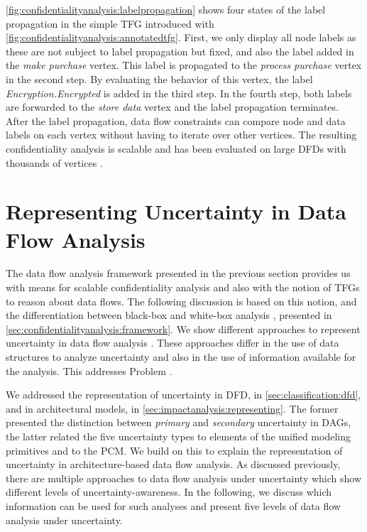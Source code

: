 \autoref{fig:confidentialityanalysis:labelpropagation} shows four states of the label propagation in the simple \ac{TFG} introduced with \autoref{fig:confidentialityanalysis:annotatedtfg}.
First, we only display all node labels as these are not subject to label propagation but fixed, and also the label added in the \emph{make purchase} vertex.
This label is propagated to the \emph{process purchase} vertex in the second step.
By evaluating the behavior of this vertex, the label \emph{Encryption.Encrypted} is added in the third step.
In the fourth step, both labels are forwarded to the \emph{store data} vertex and the label propagation terminates.
After the label propagation, data flow constraints can compare node and data labels on each vertex without having to iterate over other vertices.
The resulting confidentiality analysis is scalable and has been evaluated on large \acp{DFD} with thousands of vertices \cite{schwickerath_tool-supported_2023}. 






\section{Representing Uncertainty in Data Flow Analysis}%
\label{sec:confidentialityanalysis:representing}

The data flow analysis framework \cite{boltz_extensible_2024} presented in the previous section provides us with means for scalable confidentiality analysis and also with the notion of \acp{TFG} to reason about data flows.
The following discussion is based on this notion, and the differentiation between black-box and white-box analysis \cite{taghavi_survey_2023,heinrich_composing_2021}, presented in \autoref{sec:confidentialityanalysis:framework}.
We show different approaches to represent uncertainty in data flow analysis \cite{hahner_model-based_2023}.
These approaches differ in the use of data structures to analyze uncertainty and also in the use of information available for the analysis.
This addresses Problem .

We addressed the representation of uncertainty in \ac{DFD}, in \autoref{sec:classification:dfd}, and in architectural models, in \autoref{sec:impactanalysis:representing}.
The former presented the distinction between \emph{primary} and \emph{secondary} uncertainty in \acp{DAG}, the latter related the five uncertainty types to elements of the unified modeling primitives \cite{seifermann_unified_2021} and to the \ac{PCM}.
We build on this to explain the representation of uncertainty in architecture-based data flow analysis.
As discussed previously, there are multiple approaches to data flow analysis under uncertainty which show different levels of uncertainty-awareness.
In the following, we discuss which information can be used for such analyses and present five levels of data flow analysis under uncertainty.


